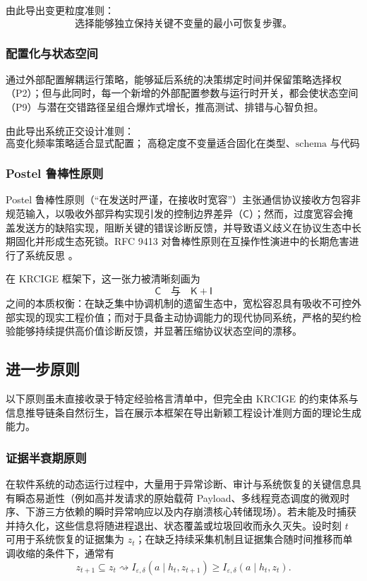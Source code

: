 \documentclass[11pt,a4paper]{ctexart}
\numberwithin{equation}{section}
\theoremstyle{definition}
\theoremstyle{plain}
\newcommand{\Know}{\mathsf{K}}
\newcommand{\Ctrl}{\mathsf{C}}
\newcommand{\Info}{\mathsf{I}}
\begin{document}
由此导出变更粒度准则：
\[
\boxed{
\text{选择能够独立保持关键不变量的最小可恢复步骤。}
}
\]

\subsubsection{配置化与状态空间}

通过外部配置解耦运行策略，能够延后系统的决策绑定时间并保留策略选择权（P2）；但与此同时，每一个新增的外部配置参数与运行时开关，都会使状态空间（P9）与潜在交错路径呈组合爆炸式增长，推高测试、排错与心智负担。

由此导出系统正交设计准则：
\[
\boxed{
\text{高变化频率策略适合显式配置；
高稳定度不变量适合固化在类型、schema 与代码约束中。}
}
\]

\subsubsection{Postel 鲁棒性原则}

Postel 鲁棒性原则（“在发送时严谨，在接收时宽容”）主张通信协议接收方包容非规范输入，以吸收外部异构实现引发的控制边界差异（$\Ctrl$）；然而，过度宽容会掩盖发送方的缺陷实现，阻断关键的错误诊断反馈，并导致语义歧义在协议生态中长期固化并形成生态死锁。RFC 9413 对鲁棒性原则在互操作性演进中的长期危害进行了系统反思 \cite{rfc9413}。

在 KRCIGE 框架下，这一张力被清晰刻画为
\[
\Ctrl
\quad\text{与}\quad
\Know+\Info
\]
之间的本质权衡：在缺乏集中协调机制的遗留生态中，宽松容忍具有吸收不可控外部实现的现实工程价值；而对于具备主动协调能力的现代协同系统，严格的契约检验能够持续提供高价值诊断反馈，并显著压缩协议状态空间的漂移。

\subsection{进一步原则}

以下原则虽未直接收录于特定经验格言清单中，但完全由 KRCIGE 的约束体系与信息推导链条自然衍生，旨在展示本框架在导出新颖工程设计准则方面的理论生成能力。

\subsubsection{证据半衰期原则}

在软件系统的动态运行过程中，大量用于异常诊断、审计与系统恢复的关键信息具有瞬态易逝性（例如高并发请求的原始载荷 Payload、多线程竞态调度的微观时序、下游三方依赖的瞬时异常响应以及内存崩溃核心转储现场）。若未能及时捕获并持久化，这些信息将随进程退出、状态覆盖或垃圾回收而永久灭失。设时刻 $t$ 可用于系统恢复的证据集为 $z_t$；在缺乏持续采集机制且证据集合随时间推移而单调收缩的条件下，通常有
\[
z_{t+1}\subseteq z_t
\rightsquigarrow
I_{\varepsilon,\delta}(a\mid h_t,z_{t+1})
\ge
I_{\varepsilon,\delta}(a\mid h_t,z_t).
\]
\end{document}
